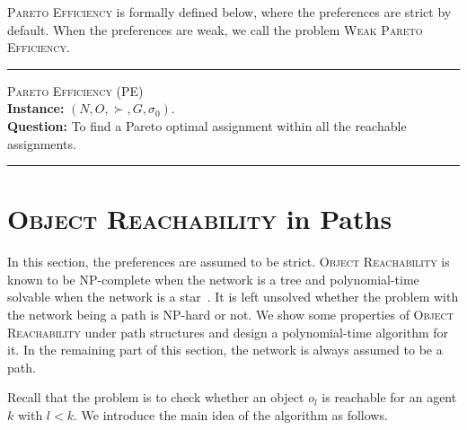 \begin{example}
\textsc{Pareto Efficiency} is formally defined below, where the preferences are strict by default.
When the preferences are weak, we call the problem \textsc{Weak Pareto Efficiency}.

\noindent\rule{\linewidth}{0.2mm}
\textsc{Pareto Efficiency} (PE)\\
\textbf{Instance:} $(N,O,\succ,G,\sigma _0)$.\\
\textbf{Question:} To find a Pareto optimal assignment within all the reachable assignments.\vspace{-0.1cm}\\
\rule{\linewidth}{0.2mm}
\vspace{-1mm}
\end{example}

\section{\textsc{Object Reachability} in Paths}\label{sec-spath}
In this section, the preferences are assumed to be strict.
\textsc{Object Reachability} is known to be NP-complete when the network is a tree and polynomial-time solvable when the network is a star~\citep{DBLP:conf/ijcai/GourvesLW17}. It is left unsolved whether the problem with the network being a path is NP-hard or not.
We show some properties of \textsc{Object Reachability} under path structures and design a polynomial-time algorithm for it.
In the remaining part of this section, the network is always assumed to be a path.



Recall that the problem is to check whether an object $o_l$ is reachable for an agent $k$ with $l< k$.
We introduce the main idea of the algorithm as follows.

